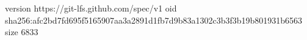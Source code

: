 version https://git-lfs.github.com/spec/v1
oid sha256:afc2bd7fd695f5165907aa3a2891d1fb7d9b83a1302c3b3f3b19b801931b6563
size 6833
